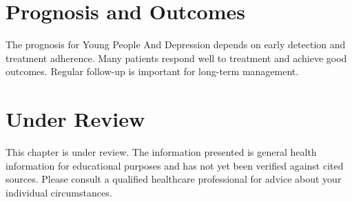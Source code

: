 \section*{Prognosis and Outcomes}
The prognosis for Young People And Depression depends on early detection and treatment adherence. Many patients respond well to treatment and achieve good outcomes. Regular follow-up is important for long-term management.
\section*{Under Review}
This chapter is under review. The information presented is general health information for educational purposes and has not yet been verified against cited sources. Please consult a qualified healthcare professional for advice about your individual circumstances.


\clearpage
